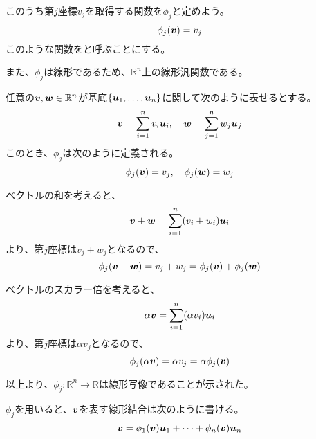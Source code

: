 \documentclass[../../../topic_linear-algebra]{subfiles}
\begin{document}
\br

このうち第$j$座標$v_j$を取得する関数を$\phi_j$と定めよう。
\begin{equation*}
  \phi_j(\vb*{v}) = v_j
\end{equation*}
このような関数をと呼ぶことにする。

\br

また、$\phi_j$は線形であるため、$\mathbb{R}^n$上の線形汎関数である。

\br

\begin{handout}
  任意の$\vb*{v},\vb*{w}\in\mathbb{R}^n$が基底$\{\vb*{u}_1, \ldots, \vb*{u}_n\}$に関して次のように表せるとする。
  \begin{equation*}
    \vb*{v} = \sum_{i=1}^n v_i \vb*{u}_i, \quad \vb*{w} = \sum_{j=1}^n w_j \vb*{u}_j
  \end{equation*}
  このとき、$\phi_j$は次のように定義される。
  \begin{equation*}
    \phi_j(\vb*{v}) = v_j, \quad \phi_j(\vb*{w}) = w_j
  \end{equation*}
  
  \br
  
  ベクトルの和を考えると、
  \begin{equation*}
    \vb*{v} + \vb*{w} = \sum_{i=1}^n (v_i + w_i) \vb*{u}_i
  \end{equation*}
  より、第$j$座標は$v_j+w_j$となるので、
  \begin{equation*}
    \phi_j(\vb*{v} + \vb*{w}) = v_j + w_j = \phi_j(\vb*{v}) + \phi_j(\vb*{w})
  \end{equation*}
  
  \br
  
  ベクトルのスカラー倍を考えると、
  \begin{equation*}
    \alpha \vb*{v} = \sum_{i=1}^n (\alpha v_i) \vb*{u}_i
  \end{equation*}
  より、第$j$座標は$\alpha v_j$となるので、
  \begin{equation*}
    \phi_j(\alpha \vb*{v}) = \alpha v_j = \alpha \phi_j(\vb*{v})
  \end{equation*}
  
  \br
  
  以上より、$\phi_j\colon\mathbb{R}^n\to\mathbb{R}$は線形写像であることが示された。
\end{handout}

\br

$\phi_j$を用いると、$\vb*{v}$を表す線形結合は次のように書ける。
\begin{equation*}
  \vb*{v} = \phi_1(\vb*{v}) \vb*{u}_1 + \cdots + \phi_n(\vb*{v}) \vb*{u}_n
\end{equation*}
\end{document}
